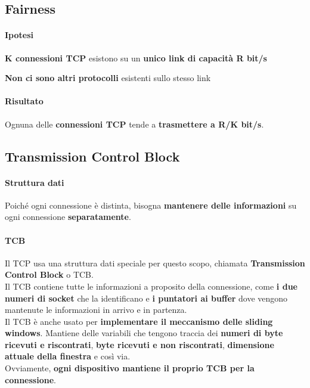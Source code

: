 \documentclass[10pt]{article}
\begin{document}
\subsection{Fairness}
\paragraph{Ipotesi} \begin{list}{}{}
\item \textbf{K connessioni TCP} esistono su un \textbf{unico link di capacità R bit/s}
\item \textbf{Non ci sono altri protocolli} esistenti sullo stesso link
\end{list}
\paragraph{Risultato} Ognuna delle \textbf{connessioni TCP} tende a \textbf{trasmettere a R/K bit/s}.
\subsection{Transmission Control Block}
\paragraph{Struttura dati} Poiché ogni connessione è distinta, bisogna \textbf{mantenere delle informazioni} su ogni connessione \textbf{separatamente}.
\paragraph{TCB} Il TCP usa una struttura dati speciale per questo scopo, chiamata \textbf{Transmission Control Block} o TCB.\\
Il TCB contiene tutte le informazioni a proposito della connessione, come \textbf{i due numeri di socket} che la identificano e \textbf{i puntatori ai buffer} dove vengono mantenute le informazioni in arrivo e in partenza.\\
Il TCB è anche usato per \textbf{implementare il meccanismo delle sliding windows}. Mantiene delle variabili che tengono traccia dei \textbf{numeri di byte ricevuti e riscontrati}, \textbf{byte ricevuti e non riscontrati}, \textbf{dimensione attuale della finestra} e così via.\\
Ovviamente, \textbf{ogni dispositivo mantiene il proprio TCB per la connessione}.
\end{document}
